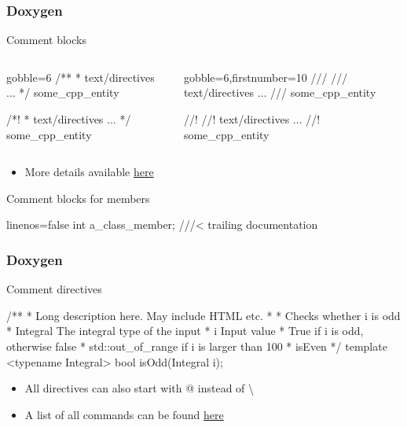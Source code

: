 \begin{frame}[fragile]
  \frametitle{Doxygen}
  \begin{block}{Comment blocks}
    \begin{columns}
      \begin{column}{.35\textwidth}
        \begin{cppcode*}{gobble=6}
          /**
           * text/directives ...
           */
          some_cpp_entity

          /*!
           * text/directives ...
           */
          some_cpp_entity
        \end{cppcode*}
      \end{column}
      \begin{column}{.35\textwidth}
        \begin{cppcode*}{gobble=6,firstnumber=10}
          ///
          /// text/directives ...
          ///
          some_cpp_entity

          //!
          //! text/directives ...
          //!
          some_cpp_entity
        \end{cppcode*}
      \end{column}
    \end{columns}
    \begin{itemize}
      \item More details available \href{https://www.doxygen.nl/manual/docblocks.html}{here}
    \end{itemize}
  \end{block}
  \begin{block}{Comment blocks for members}
    \begin{cppcode*}{linenos=false}
      int a_class_member; ///< trailing documentation
    \end{cppcode*}
  \end{block}

\end{frame}

\begin{frame}[fragile]
  \frametitle{Doxygen}
  \begin{block}{Comment directives}
    \begin{cppcode*}{}
      /**
       * Long description here. May include HTML etc.
       *
       * \brief Checks whether i is odd
       * \tparam Integral The integral type of the input
       * \param i Input value
       * \return True if i is odd, otherwise false
       * \throw std::out_of_range if i is larger than 100
       * \see isEven
       */
      template <typename Integral>
      bool isOdd(Integral i);
    \end{cppcode*}
    \begin{itemize}
      \item All directives can also start with @ instead of \textbackslash
      \item A list of all commands can be found \href{https://doxygen.nl/manual/commands.html}{here}
    \end{itemize}
  \end{block}
\end{frame}
